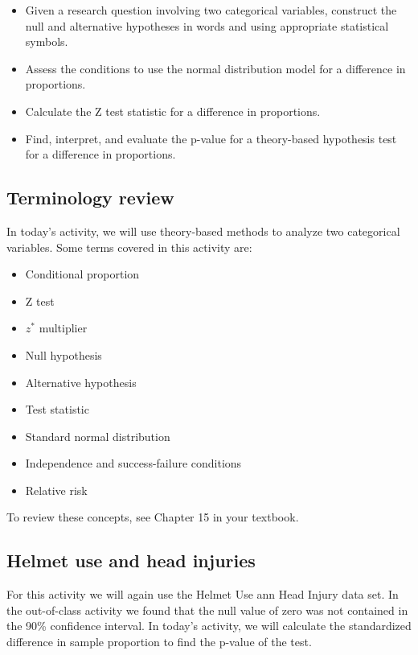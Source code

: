 \documentclass[
]{report}
\begin{document}
\begin{itemize}
\item
  Given a research question involving two categorical variables, construct the null and alternative hypotheses
  in words and using appropriate statistical symbols.
\item
  Assess the conditions to use the normal distribution model for a difference in proportions.
\item
  Calculate the Z test statistic for a difference in proportions.
\item
  Find, interpret, and evaluate the p-value for a theory-based hypothesis test for a difference in proportions.
\end{itemize}

\hypertarget{terminology-review-16}{%
\subsection{Terminology review}\label{terminology-review-16}}

In today's activity, we will use theory-based methods to analyze two categorical variables. Some terms covered in this activity are:

\begin{itemize}
\item
  Conditional proportion
\item
  Z test
\item
  \(z^*\) multiplier
\item
  Null hypothesis
\item
  Alternative hypothesis
\item
  Test statistic
\item
  Standard normal distribution
\item
  Independence and success-failure conditions
\item
  Relative risk
\end{itemize}

To review these concepts, see Chapter 15 in your textbook.

\hypertarget{helmet-use-and-head-injuries}{%
\subsection{Helmet use and head injuries}\label{helmet-use-and-head-injuries}}

For this activity we will again use the Helmet Use ann Head Injury data set. In the out-of-class activity we found that the null value of zero was not contained in the 90\% confidence interval. In today's activity, we will calculate the standardized difference in sample proportion to find the p-value of the test.
\end{document}
